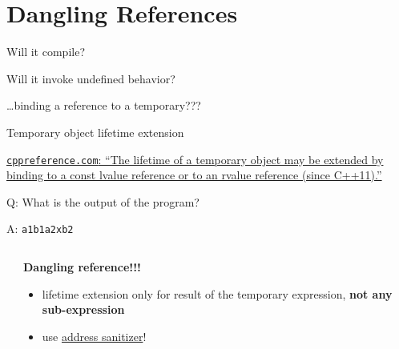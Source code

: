 \begin{frame}
    \centering
    \scalebox{5}{PART II}
\end{frame}

\begin{frame}
    \centering
    \scalebox{3}{Dangling References}
\end{frame}

\section{Dangling References}

\begin{frame}[fragile]{Will it compile?}

\end{frame}

\begin{frame}[fragile]{Will it invoke undefined behavior?}

    \hfill \ldots binding a reference to a temporary???
\end{frame}

\begin{frame}[fragile]{Temporary object lifetime extension}

    \href{https://en.cppreference.com/w/cpp/language/lifetime}{\texttt{cppreference.com}: \enquote{The lifetime of a temporary object may be extended by binding to a const lvalue reference or to an rvalue reference (since C++11).}}
\end{frame}

\begin{frame}[fragile]{Q: What is the output of the program?}
\end{frame}

\begin{frame}[fragile]{A: \texttt{a1b1a2xb2}}
    \begin{columns}
        \begin{column}{.55\textwidth}
        \end{column}
        \begin{column}{.4\textwidth}
            \textbf{Dangling reference!!!}
            \begin{itemize}
                \item lifetime extension only for result of the temporary expression, \textbf{not any sub-expression}
                \item use \href{https://clang.llvm.org/docs/AddressSanitizer.html}{address sanitizer}!    
            \end{itemize}
        \end{column}
    \end{columns}
\end{frame}

